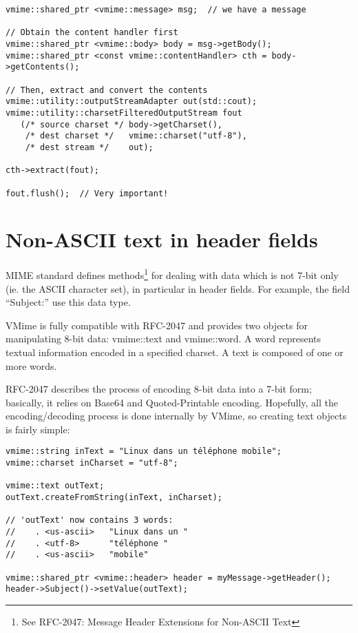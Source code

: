 \begin{lstlisting}[caption={Extracting and converting body contents to a
specified charset}]
vmime::shared_ptr <vmime::message> msg;  // we have a message

// Obtain the content handler first
vmime::shared_ptr <vmime::body> body = msg->getBody();
vmime::shared_ptr <const vmime::contentHandler> cth = body->getContents();

// Then, extract and convert the contents
vmime::utility::outputStreamAdapter out(std::cout);
vmime::utility::charsetFilteredOutputStream fout
   (/* source charset */ body->getCharset(),
    /* dest charset */   vmime::charset("utf-8"),
    /* dest stream */    out);

cth->extract(fout);

fout.flush();  // Very important!
\end{lstlisting}


\section{Non-ASCII text in header fields}

MIME standard defines methods\footnote{See RFC-2047: Message Header Extensions
for Non-ASCII Text} for dealing with data which is not 7-bit only (ie. the
ASCII character set), in particular in header fields. For example, the field
``Subject:'' use this data type.

VMime is fully compatible with RFC-2047 and provides two objects for
manipulating 8-bit data: {\vcode vmime::text} and {\vcode vmime::word}. A word
represents textual information encoded in a specified charset. A text is
composed of one or more words.

RFC-2047 describes the process of encoding 8-bit data into a 7-bit form;
basically, it relies on Base64 and Quoted-Printable encoding. Hopefully, all
the encoding/decoding process is done internally by VMime, so creating text
objects is fairly simple:

\begin{lstlisting}[caption={Creating \vcode{vmime::text} objects}]
vmime::string inText = "Linux dans un téléphone mobile";
vmime::charset inCharset = "utf-8";

vmime::text outText;
outText.createFromString(inText, inCharset);

// 'outText' now contains 3 words:
//    . <us-ascii>   "Linux dans un "
//    . <utf-8>      "téléphone "
//    . <us-ascii>   "mobile"

vmime::shared_ptr <vmime::header> header = myMessage->getHeader();
header->Subject()->setValue(outText);
\end{lstlisting}


